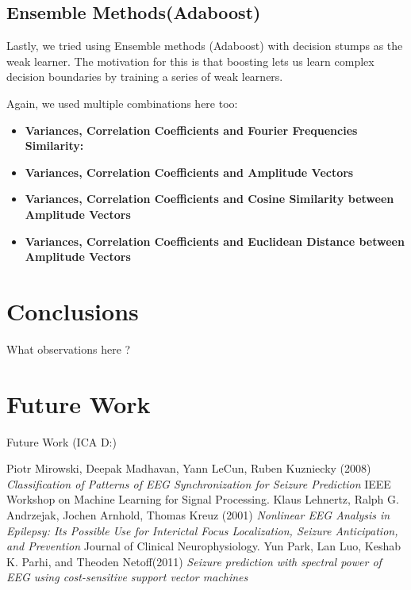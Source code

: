 \documentclass[a4paper]{article}
\begin{document}
\subsection{Ensemble Methods(Adaboost)}
Lastly, we tried using Ensemble methods (Adaboost) with decision stumps as the weak learner. The motivation for this is that boosting lets us learn complex decision boundaries by training a series of weak learners. 

Again, we used multiple combinations here too:

\begin{itemize}
\item \textbf{Variances, Correlation Coefficients and Fourier Frequencies Similarity:} 
\item \textbf{Variances, Correlation Coefficients and Amplitude Vectors}
\item \textbf{Variances, Correlation Coefficients and Cosine Similarity between Amplitude Vectors}
\item \textbf{Variances, Correlation Coefficients and Euclidean Distance between Amplitude Vectors}
\end{itemize}

\section{Conclusions}
What observations here ?

\section{Future Work}
Future Work (ICA D:)

\begin{thebibliography}{99}
 Piotr Mirowski, Deepak Madhavan, Yann LeCun, Ruben Kuzniecky (2008) \textit{Classification of Patterns of EEG Synchronization for Seizure Prediction} IEEE Workshop on Machine Learning for Signal Processing.
 Klaus Lehnertz, Ralph G. Andrzejak, Jochen Arnhold, Thomas Kreuz (2001) \textit{Nonlinear EEG Analysis in Epilepsy: Its Possible Use for Interictal Focus Localization, Seizure Anticipation, and Prevention} Journal of Clinical Neurophysiology.
 Yun Park, Lan Luo, Keshab K. Parhi, and Theoden Netoff(2011) \textit{Seizure prediction with spectral power of EEG using cost-sensitive support vector machines}

\end{thebibliography}

\clearpage
\end{document}
